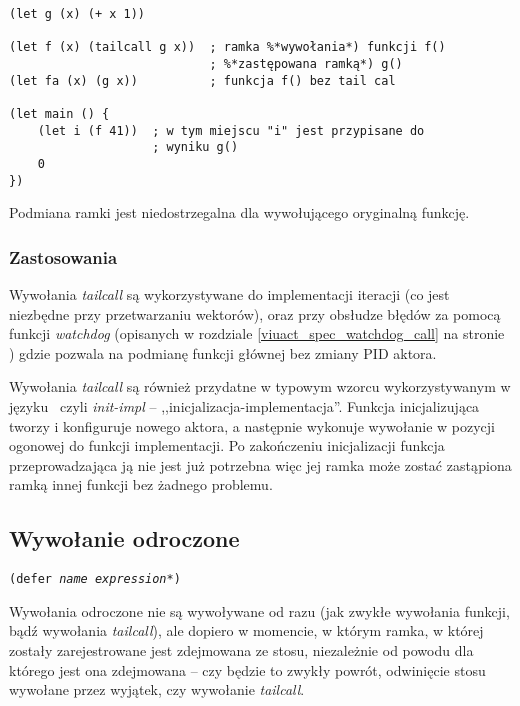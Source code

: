 \begin{lstlisting}
(let g (x) (+ x 1))

(let f (x) (tailcall g x))  ; ramka %*wywołania*) funkcji f()
                            ; %*zastępowana ramką*) g()
(let fa (x) (g x))          ; funkcja f() bez tail cal

(let main () {
    (let i (f 41))  ; w tym miejscu "i" jest przypisane do
                    ; wyniku g()
    0
})
\end{lstlisting}

Podmiana ramki jest niedostrzegalna dla wywołującego oryginalną funkcję.

\subsubsection{Zastosowania}
\label{viuact_spec_tail_call_use_case}

Wywołania \emph{tailcall} są wykorzystywane do implementacji iteracji (co jest
niezbędne przy przetwarzaniu wektorów), oraz przy obsłudze błędów za pomocą
funkcji \emph{watchdog} (opisanych w rozdziale \ref{viuact_spec_watchdog_call}
na stronie \pageref{viuact_spec_watchdog_call}) gdzie pozwala na podmianę
funkcji głównej bez zmiany PID aktora.

Wywołania \emph{tailcall} są również przydatne w typowym wzorcu wykorzystywanym
w języku \ViuAct\ czyli \emph{init-impl} -- ,,inicjalizacja-implementacja''.
Funkcja inicjalizująca tworzy i konfiguruje nowego aktora, a następnie wykonuje
wywołanie w pozycji ogonowej do funkcji implementacji. Po zakończeniu
inicjalizacji funkcja przeprowadzająca ją nie jest już potrzebna więc jej ramka
może zostać zastąpiona ramką innej funkcji bez żadnego problemu.

\subsection{Wywołanie odroczone}
\label{viuact_spec_deferred_call}

\texttt{(defer \emph{name} \emph{expression}*)}
\newline

Wywołania odroczone nie są wywoływane od razu (jak zwykłe wywołania funkcji, bądź wywołania \emph{tailcall}),
ale dopiero w momencie, w którym ramka, w której zostały zarejestrowane jest zdejmowana ze stosu, niezależnie
od powodu dla którego jest ona zdejmowana -- czy będzie to zwykły powrót, odwinięcie stosu wywołane przez
wyjątek, czy wywołanie \emph{tailcall}.

